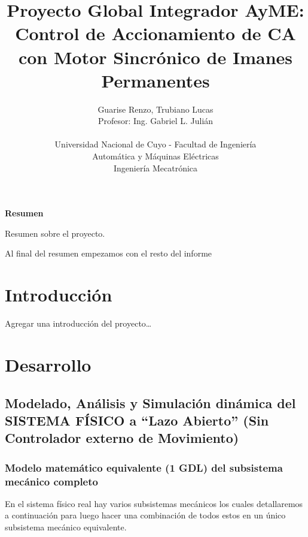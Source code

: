 \documentclass[10pt]{article}
\title{Proyecto Global Integrador AyME:\\
Control de Accionamiento de CA con Motor Sincrónico de Imanes Permanentes}
\author{Guarise Renzo, Trubiano Lucas\\
Profesor: Ing. Gabriel L. Julián\\
\\
Universidad Nacional de Cuyo - Facultad de Ingeniería\\
Automática y Máquinas Eléctricas\\
Ingeniería Mecatrónica}
\begin{document}
\maketitle

\begin{center} %
    {\Large \textbf{Resumen}}
\end{center}

Resumen sobre el proyecto.

Al final del resumen empezamos con el resto del informe

\newpage


\section{Introducción}

Agregar una introducción del proyecto\dots

\section{Desarrollo}
\subsection{Modelado, Análisis y Simulación dinámica del SISTEMA FÍSICO a “Lazo Abierto” (Sin Controlador externo de Movimiento)}
\subsubsection{Modelo matemático equivalente (1 GDL) del subsistema mecánico completo}
En el sistema físico real hay varios subsistemas mecánicos los cuales detallaremos a continuación para luego hacer una combinación de todos estos en un único subsistema mecánico equivalente.
\end{document}
